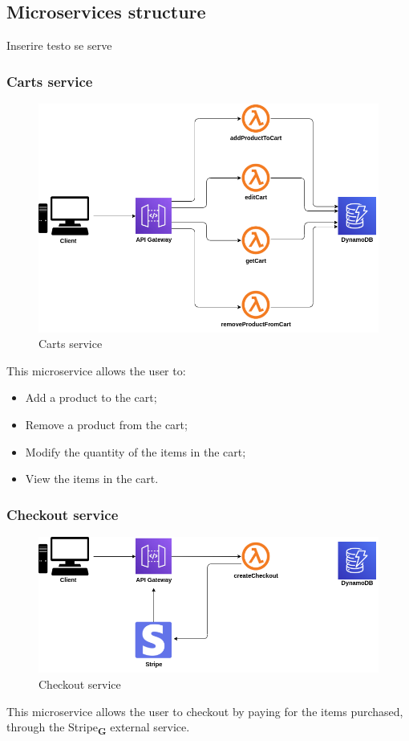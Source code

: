 \subsection{Microservices structure}
Inserire testo se serve
\subsubsection{Carts service}
\begin{figure}[!h]
    \vspace{5px}
    \includegraphics[scale=0.5]{../../../../Images/Diagrammi/maintainerManual/cartService.png}
    \centering
    \caption{Carts service}
\end{figure}
This microservice allows the user to:
\begin{itemize}
    \item Add a product to the cart;
    \item Remove a product from the cart;
    \item Modify the quantity of the items in the cart;
    \item View the items in the cart.
\end{itemize}

\subsubsection{Checkout service}
\begin{figure}[!h]
    \vspace{5px}
    \includegraphics[scale=0.5]{../../../../Images/Diagrammi/maintainerManual/checkoutService.png}
    \centering
    \caption{Checkout service}
\end{figure}
This microservice allows the user to checkout by paying for the items purchased, through the Stripe\textsubscript{\textbf{G}} external service.

